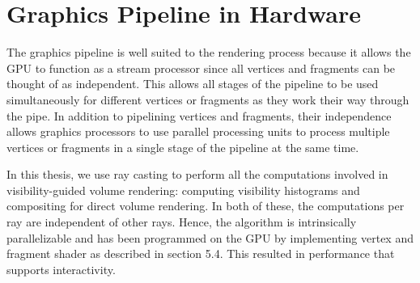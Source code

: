 \section{Graphics Pipeline in Hardware}

The graphics pipeline is well suited to the rendering process because it allows the GPU to function as a stream processor since all vertices and fragments can be thought of as independent. This allows all stages of the pipeline to be used simultaneously for different vertices or fragments as they work their way through the pipe. In addition to pipelining vertices and fragments, their independence allows graphics processors to use parallel processing units to process multiple vertices or fragments in a single stage of the pipeline at the same time.

In this thesis, we use ray casting to perform all the computations involved in visibility-guided volume rendering: computing visibility histograms and compositing for direct volume rendering. In both of these, the computations per ray are independent of other rays. Hence, the algorithm is intrinsically parallelizable and has been programmed on the GPU by implementing vertex and fragment shader as described in section 5.4. This resulted in performance that supports interactivity. 



